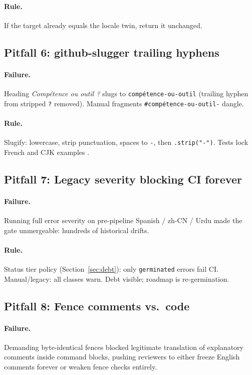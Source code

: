 \documentclass[11pt]{article}
\theoremstyle{definition}
\theoremstyle{plain}
\theoremstyle{remark}
\begin{document}
\paragraph{Rule.} If the target already equals the locale twin, return it
unchanged.

\subsection{Pitfall 6: github-slugger trailing hyphens}

\paragraph{Failure.} Heading \emph{Comp\'etence ou outil ?} slugs to
\texttt{comp\'etence-ou-outil} (trailing hyphen from stripped \texttt{?}
removed). Manual fragments \texttt{\#comp\'etence-ou-outil-} dangle.

\paragraph{Rule.} Slugify: lowercase, strip punctuation, spaces to
\texttt{-}, then \texttt{.strip("-")}. Tests lock French and CJK examples
\citep{hermespr80391}.

\subsection{Pitfall 7: Legacy severity blocking CI forever}

\paragraph{Failure.} Running full error severity on pre-pipeline Spanish /
zh-CN / Urdu made the gate unmergeable: hundreds of historical drifts.

\paragraph{Rule.} Status tier policy (Section~\ref{sec:debt}): only
\texttt{germinated} errors fail CI. Manual/legacy: all classes warn. Debt
visible; roadmap is re-germination.

\subsection{Pitfall 8: Fence comments vs.\ code}

\paragraph{Failure.} Demanding byte-identical fences blocked legitimate
translation of explanatory comments inside command blocks, pushing reviewers
to either freeze English comments forever or weaken fence checks entirely.
\end{document}
